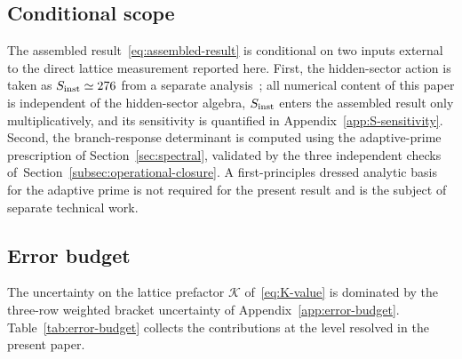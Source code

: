 \documentclass[a4paper,11pt]{article}
\theoremstyle{definition}
\begin{document}
\subsection{Conditional scope}
\label{subsec:assembly-conditional}

The assembled result~\eqref{eq:assembled-result} is conditional on
two inputs external to the direct lattice measurement reported
here. First, the hidden-sector action is taken as
$S_{\rm inst} \simeq 276$ from a separate
analysis~\cite{companion-structural}; all numerical content of this
paper is independent of the hidden-sector algebra, $S_{\rm inst}$
enters the assembled result only multiplicatively, and its
sensitivity is quantified in Appendix~\ref{app:S-sensitivity}.
Second, the branch-response determinant is computed using the
adaptive-prime prescription of Section~\ref{sec:spectral},
validated by the three independent checks
of~Section~\ref{subsec:operational-closure}. A first-principles dressed
analytic basis for the adaptive prime is not required for the
present result and is the subject of separate technical work.

\subsection{Error budget}
\label{subsec:error-budget}

The uncertainty on the lattice prefactor $\mathcal{K}$
of~\eqref{eq:K-value} is dominated by the three-row weighted
bracket uncertainty of Appendix~\ref{app:error-budget}.
Table~\ref{tab:error-budget} collects the contributions at the
level resolved in the present paper.
\end{document}

